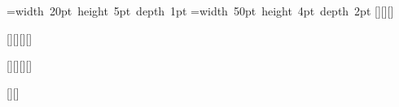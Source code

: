 \documentclass{article}
\begin{document}
\sbox{\mb}{\rule[-3pt]{100pt}{10pt}}\setbox\nb=\hbox{\vrule width 20pt height 5pt depth 1pt}%
=\hbox{\vrule width 50pt height 4pt depth 2pt}
\makeatletter\newsavebox{\my@box}\sbox{\my@box}{\rule{30pt}{1pt}}\makeatother
\pgfmathparse{\wd\mb}[\pgfmathresult]\pgfmathparse{\ht\mb}[\pgfmathresult]\pgfmathparse{\dp\mb}[\pgfmathresult]

[\pgfmathresult][\pgfmathresult][\pgfmathresult]\pgfmathparse{\wd\bn}[\pgfmathresult]

\pgfmathparse{2\wd\mb}[\pgfmathresult][\pgfmathresult][\pgfmathresult]\pgfmathparse{-\dp\nb}[\pgfmathresult]

\makeatletter\pgfmathsetmacro{\w}{\wd\my@box}[\w]\makeatother{}[\q]
\end{document}
